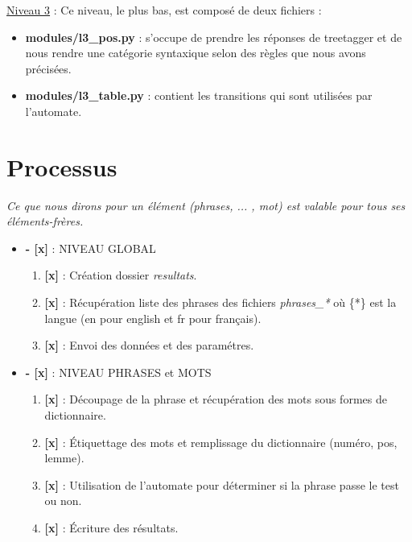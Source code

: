 \underline{Niveau 3} : Ce niveau, le plus bas, est composé de deux fichiers :

	\begin{itemize}
	\item \textbf{modules/l3\_pos.py} : s'occupe de prendre les réponses de treetagger et de nous rendre une catégorie syntaxique selon des règles que nous avons précisées. \\
	\item \textbf{modules/l3\_table.py} : contient les transitions qui sont utilisées par l'automate. \\
	\end{itemize}


\section{Processus}

\emph{Ce que nous dirons pour un élément (phrases, ... , mot) est valable pour tous ses éléments-frères.} 

\begin{itemize}
\item \textbf{- [x] } : NIVEAU GLOBAL
\begin{enumerate}
\item \textbf{[x]} : Création dossier \emph{resultats}.
\item \textbf{[x]} : Récupération liste des phrases des fichiers \emph{phrases\_*} où \{*\} est la langue (en pour english et fr pour français).
\item \textbf{[x]} : Envoi des données et des paramétres.
\end{enumerate}
\item \textbf{- [x] } : NIVEAU PHRASES et MOTS
\begin{enumerate}
\item \textbf{[x]} : Découpage de la phrase et récupération des mots sous formes de dictionnaire.
\item \textbf{[x]} : Étiquettage des mots et remplissage du dictionnaire (numéro, pos, lemme).
\item \textbf{[x]} : Utilisation de l'automate pour déterminer si la phrase passe le test ou non.
\item \textbf{[x]} : Écriture des résultats.
\end{enumerate}

\end{itemize}





  